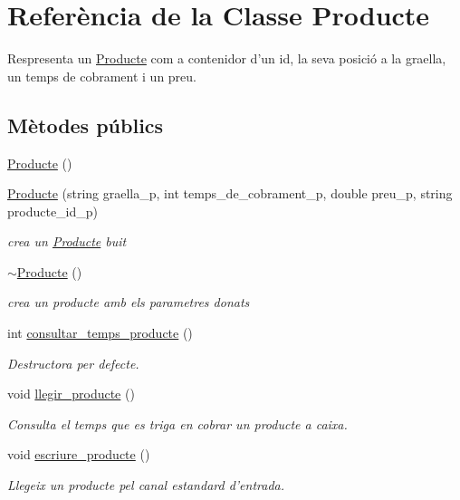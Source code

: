 \hypertarget{class_producte}{\section{Referència de la Classe Producte}
\label{class_producte}
}


Respresenta un \hyperlink{class_producte}{Producte} com a contenidor d'un id, la seva posició a la graella, un temps de cobrament i un preu.  


\subsection*{Mètodes públics}
\begin{DoxyCompactItemize}
\item 
\hyperlink{class_producte_aa3df33bb7528537f4eefbb92e7e4c2f3}{Producte} ()
\item 
\hyperlink{class_producte_ac7a18d4d3047ec7daf9403d20f13c4d9}{Producte} (string graella\-\_\-p, int temps\-\_\-de\-\_\-cobrament\-\_\-p, double preu\-\_\-p, string producte\-\_\-id\-\_\-p)
\begin{DoxyCompactList}\small\item\em crea un \hyperlink{class_producte}{Producte} buit \end{DoxyCompactList}\item 
\hyperlink{class_producte_ac99ae026acafc3504ed5e2c4e4bb2817}{$\sim$\-Producte} ()
\begin{DoxyCompactList}\small\item\em crea un producte amb els parametres donats \end{DoxyCompactList}\item 
int \hyperlink{class_producte_abe6eadf62ca2c47dc3cabd5d561d8fdd}{consultar\-\_\-temps\-\_\-producte} ()
\begin{DoxyCompactList}\small\item\em Destructora per defecte. \end{DoxyCompactList}\item 
void \hyperlink{class_producte_a845c6ce3ecc9a59b8d395af37ab635b5}{llegir\-\_\-producte} ()
\begin{DoxyCompactList}\small\item\em Consulta el temps que es triga en cobrar un producte a caixa. \end{DoxyCompactList}\item 
void \hyperlink{class_producte_a8713d47b8527c1279a8c6442f56fa5cb}{escriure\-\_\-producte} ()
\begin{DoxyCompactList}\small\item\em Llegeix un producte pel canal estandard d'entrada. \end{DoxyCompactList}\item 

\end{DoxyCompactItemize}
